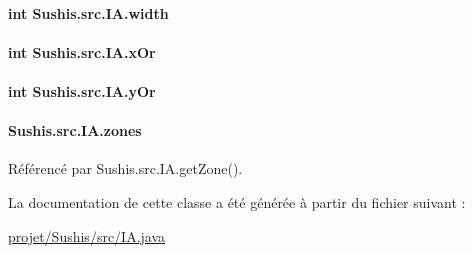 \paragraph[{width}]{\setlength{\rightskip}{0pt plus 5cm}int Sushis.\+src.\+I\+A.\+width\hspace{0.3cm}{\ttfamily [private]}}\label{classSushis_1_1src_1_1IA_ae72069abf3035484ac8c0acd9dadbb4a}
\hypertarget{classSushis_1_1src_1_1IA_aaa01e3156a3a39dd19701e89d4518c2b}{}
\paragraph[{x\+Or}]{\setlength{\rightskip}{0pt plus 5cm}int Sushis.\+src.\+I\+A.\+x\+Or\hspace{0.3cm}{\ttfamily [static]}}\label{classSushis_1_1src_1_1IA_aaa01e3156a3a39dd19701e89d4518c2b}
\hypertarget{classSushis_1_1src_1_1IA_aa970ffebf19547e72c59f109c428ef14}{}
\paragraph[{y\+Or}]{\setlength{\rightskip}{0pt plus 5cm}int Sushis.\+src.\+I\+A.\+y\+Or\hspace{0.3cm}{\ttfamily [static]}}\label{classSushis_1_1src_1_1IA_aa970ffebf19547e72c59f109c428ef14}
\hypertarget{classSushis_1_1src_1_1IA_a019c981a7f6d249d7b7c54fb08edaa67}{}
\paragraph[{zones}]{ Sushis.\+src.\+I\+A.\+zones\hspace{0.3cm}{\ttfamily [private]}}\label{classSushis_1_1src_1_1IA_a019c981a7f6d249d7b7c54fb08edaa67}


Référencé par Sushis.\+src.\+I\+A.\+get\+Zone().



La documentation de cette classe a été générée à partir du fichier suivant \+:\begin{DoxyCompactItemize}
\item 
\hyperlink{projet_2Sushis_2src_2IA_8java}{projet/\+Sushis/src/\+I\+A.\+java}\end{DoxyCompactItemize}
